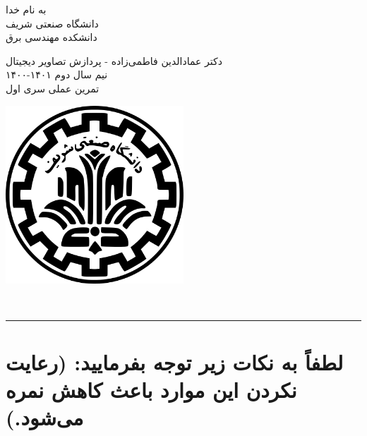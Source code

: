\documentclass[a4paper]{article}
\begin{document}
\begin{minipage}{0.6\textwidth}
\begin{bf}
\begin{center}
	به نام خدا\\
	\vspace{0.25cm}
	دانشگاه صنعتی شریف\\
	\vspace{0.25cm}
	دانشکده مهندسی برق\\
	\vspace{0.5cm}

\large
دکتر عمادالدین فاطمی‌زاده - پردازش تصاویر دیجیتال \\
نیم سال دوم
۱۴۰۱-۱۴۰۰\\
\Large
\vspace{0.4cm}
تمرین عملی سری اول\\
\end{center}
\end{bf}
\normalsize
\end{minipage} \hfill
\begin{minipage}{0.35\textwidth}
\begin{flushleft}
\includegraphics[width=0.5\textwidth]{Shariflogo.png}\\ \large
\end{flushleft}

 \end{minipage}
\\

\rule[0.1\baselineskip]{\textwidth}{1pt}

\large
\section*{
لطفاً به نکات زیر توجه بفرمایید: (رعایت نکردن این موارد باعث کاهش نمره می‌شود.)
}
\end{document}
